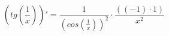 \documentclass[a4paper,12pt]{article}
\begin{document}
$$( tg ( \frac{1}{x} ) )' =  \frac{1}{( cos ( \frac{1}{x} ) ) ^{2} }  \cdot  \frac{((-1) \cdot 1)}{x ^{2} } $$
\end{document}
